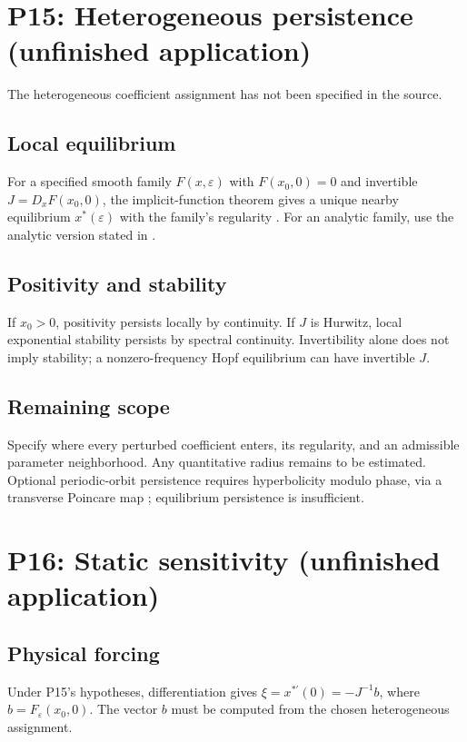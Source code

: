 \documentclass[11pt]{article}
\newcommand{\eps}{\varepsilon}
\theoremstyle{definition}
\theoremstyle{remark}
\begin{document}
\section{P15: Heterogeneous persistence (unfinished application)}
\label{sec:P15}
The heterogeneous coefficient assignment has not been specified in the source.
\subsection{Local equilibrium}\label{slot:P15-1}
For a specified smooth family $F(x,\eps)$ with $F(x_0,0)=0$ and
invertible $J=D_xF(x_0,0)$, the implicit-function theorem gives a
unique nearby equilibrium $x^*(\eps)$ with the family's regularity
\cite[Ch.~1]{GuckenheimerHolmes1983}. For an analytic family, use the
analytic version stated in \cite[\S3.2]{GreenbaumLiOverton2020}.
\subsection{Positivity and stability}\label{slot:P15-2}
If $x_0>0$, positivity persists locally by continuity. If $J$ is
Hurwitz, local exponential stability persists by spectral continuity.
Invertibility alone does not imply stability; a nonzero-frequency Hopf
equilibrium can have invertible $J$.
\subsection{Remaining scope}\label{slot:P15-3}
Specify where every perturbed coefficient enters, its regularity, and an
admissible parameter neighborhood. Any quantitative radius remains to be
estimated. Optional periodic-orbit persistence requires hyperbolicity
modulo phase, via a transverse Poincare map
\cite[Ch.~1]{GuckenheimerHolmes1983}; equilibrium persistence is insufficient.


\section{P16: Static sensitivity (unfinished application)}
\label{sec:P16}
\subsection{Physical forcing}\label{slot:P16-1}
Under P15's hypotheses, differentiation gives
$\xi=x^{*\prime}(0)=-J^{-1}b$, where $b=F_\eps(x_0,0)$.
The vector $b$ must be computed from the chosen heterogeneous assignment.
\end{document}
